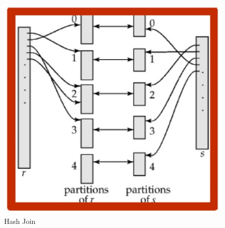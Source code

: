 \begin{minipage}{0.45\textwidth}
    \begin{figure}[H]
        \includegraphics[width=\textwidth]{images/Screenshot 2024-05-25 at 11.50.16.jpg}
        \caption{Hash Join}
    \end{figure}
\end{minipage}
